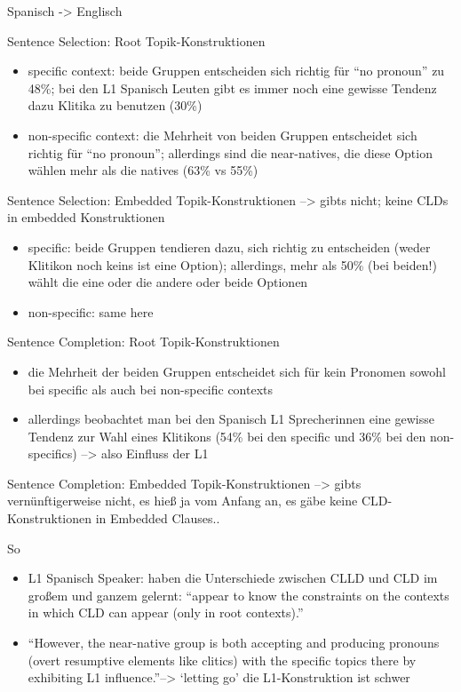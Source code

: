 Spanisch -> Englisch

Sentence Selection: Root Topik-Konstruktionen
\begin{itemize}
    \item specific context: beide Gruppen entscheiden sich richtig für ``no pronoun'' zu 48\%; bei den L1 Spanisch Leuten gibt es immer noch eine gewisse Tendenz dazu Klitika zu benutzen (30\%)
    \item non-specific context: die Mehrheit von beiden Gruppen entscheidet sich richtig für ``no pronoun''; allerdings sind die near-natives, die diese Option wählen mehr als die natives (63\% vs 55\%)
\end{itemize}

Sentence Selection: Embedded Topik-Konstruktionen --> gibts nicht; keine CLDs in embedded Konstruktionen
\begin{itemize}
    \item specific: beide Gruppen tendieren dazu, sich richtig zu entscheiden (weder Klitikon noch keins ist eine Option); allerdings, mehr als 50\% (bei beiden!) wählt die eine oder die andere oder beide Optionen
    \item non-specific: same here
\end{itemize}

Sentence Completion: Root Topik-Konstruktionen
\begin{itemize}
    \item die Mehrheit der beiden Gruppen entscheidet sich für kein Pronomen sowohl bei specific als auch bei non-specific contexts
    \item allerdings beobachtet man bei den Spanisch L1 Sprecherinnen eine gewisse Tendenz zur Wahl eines Klitikons (54\% bei den specific und 36\% bei den non-specifics) --> also Einfluss der L1
\end{itemize}

Sentence Completion: Embedded Topik-Konstruktionen
--> gibts vernünftigerweise nicht, es hieß ja vom Anfang an, es gäbe keine CLD-Konstruktionen in Embedded Clauses..

So
\begin{itemize}
    \item L1 Spanisch Speaker: haben die Unterschiede zwischen CLLD und CLD im großem und ganzem gelernt: ``appear to know the constraints on the contexts in which CLD can appear (only in root contexts).''
    \item ``However, the near-native group is both accepting and producing pronouns (overt resumptive elements like clitics) with the specific topics there by exhibiting L1 influence.''--> `letting go' die L1-Konstruktion ist schwer
\end{itemize}

